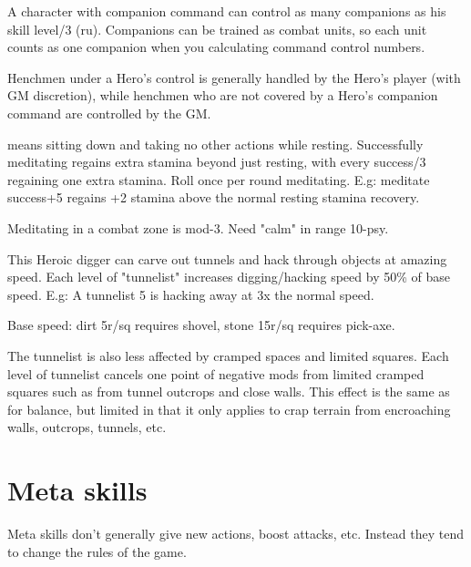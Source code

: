 A character with companion command can control as many companions as his skill level/3 (ru). Companions can be trained as combat units, so each unit counts as one companion when you calculating command control numbers.

Henchmen under a Hero's control is generally handled by the Hero's player (with GM discretion), while henchmen who are not covered by a Hero's companion command are controlled by the GM.


 means sitting down and taking no other actions while resting. Successfully meditating regains extra stamina beyond just resting, with every success/3 regaining one extra stamina. Roll once per round meditating. E.g: meditate success+5 regains +2 stamina above the normal resting stamina recovery.

Meditating in a combat zone is mod-3. Need "calm" in range 10-psy.


 This Heroic digger can carve out tunnels and hack through objects at amazing speed. Each level of "tunnelist" increases digging/hacking speed by 50\% of base speed. E.g: A tunnelist 5 is hacking away at 3x the normal speed.

Base speed: dirt 5r/sq requires shovel, stone 15r/sq requires pick-axe.

The tunnelist is also less affected by cramped spaces and limited squares. Each level of tunnelist cancels one point of negative mods from limited cramped squares such as from tunnel outcrops and close walls. This effect is the same as for balance, but limited in that it only applies to crap terrain from encroaching walls, outcrops, tunnels, etc.


\closeskillslist


















\section*{Meta skills}

Meta skills don't generally give new actions, boost attacks, etc. Instead they tend to change the rules of the game.



